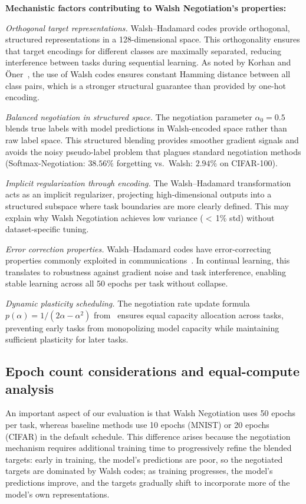\documentclass[preprint,review,12pt]{elsarticle}
\begin{document}
\textbf{Mechanistic factors contributing to Walsh Negotiation's properties:}

\textit{Orthogonal target representations.} Walsh--Hadamard codes provide orthogonal, structured representations in a 128-dimensional space. This orthogonality ensures that target encodings for different classes are maximally separated, reducing interference between tasks during sequential learning. As noted by Korhan and {\"O}ner~\cite{korhan2023negotiated}, the use of Walsh codes ensures constant Hamming distance between all class pairs, which is a stronger structural guarantee than provided by one-hot encoding.

\textit{Balanced negotiation in structured space.} The negotiation parameter $\alpha_0 = 0.5$ blends true labels with model predictions in Walsh-encoded space rather than raw label space. This structured blending provides smoother gradient signals and avoids the noisy pseudo-label problem that plagues standard negotiation methods (Softmax-Negotiation: $38.56\%$ forgetting vs.\ Walsh: $2.94\%$ on CIFAR-100).

\textit{Implicit regularization through encoding.} The Walsh--Hadamard transformation acts as an implicit regularizer, projecting high-dimensional outputs into a structured subspace where task boundaries are more clearly defined. This may explain why Walsh Negotiation achieves low variance ($<$\,1\% std) without dataset-specific tuning.

\textit{Error correction properties.} Walsh--Hadamard codes have error-correcting properties commonly exploited in communications~\cite{olmez2021walsh}. In continual learning, this translates to robustness against gradient noise and task interference, enabling stable learning across all 50 epochs per task without collapse.

\textit{Dynamic plasticity scheduling.} The negotiation rate update formula $p(\alpha) = 1/(2\alpha - \alpha^2)$ from~\cite{korhan2023negotiated} ensures equal capacity allocation across tasks, preventing early tasks from monopolizing model capacity while maintaining sufficient plasticity for later tasks.

\subsection{Epoch count considerations and equal-compute analysis}
\label{sec:discussion_epochs}

An important aspect of our evaluation is that Walsh Negotiation uses 50 epochs per task, whereas baseline methods use 10 epochs (MNIST) or 20 epochs (CIFAR) in the default schedule. This difference arises because the negotiation mechanism requires additional training time to progressively refine the blended targets: early in training, the model's predictions are poor, so the negotiated targets are dominated by Walsh codes; as training progresses, the model's predictions improve, and the targets gradually shift to incorporate more of the model's own representations.
\end{document}
